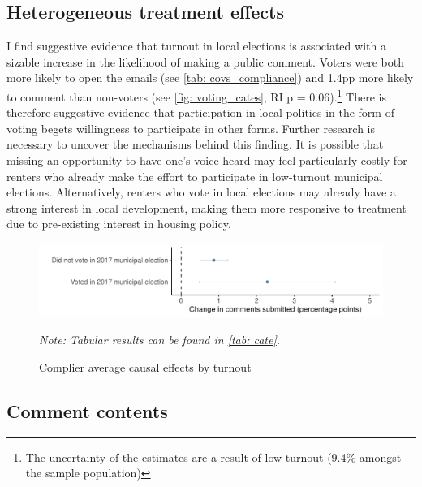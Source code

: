 \documentclass[12pt,final,fleqn]{article}
\theoremstyle{plain}
\begin{document}
\subsection{Heterogeneous treatment effects}

I find suggestive evidence that turnout in local elections is associated with a sizable increase in the likelihood of making a public comment. Voters were both more likely to open the emails (see \autoref{tab: covs_compliance}) and 1.4pp more likely to comment than non-voters (see \autoref{fig: voting_cates}, RI p = 0.06).\footnote{The uncertainty of the estimates are a result of low turnout (9.4\% amongst the sample population)} There is therefore suggestive evidence that participation in local politics in the form of voting begets willingness to participate in other forms. Further research is necessary to uncover the mechanisms behind this finding. It is possible that missing an opportunity to have one’s voice heard may feel particularly costly for renters who already make the effort to participate in low-turnout municipal elections. Alternatively, renters who vote in local elections may already have a strong interest in local development, making them more responsive to treatment due to pre-existing interest in housing policy. 

\begin{figure}[H]
\includegraphics[width = \textwidth]{../figs/fg4.pdf}
\caption{Complier average causal effects by turnout}
\vspace{-0.5cm}
{\small \textit{Note: Tabular results can be found in \autoref{tab: cate}.}}
\label{fig: voting_cates}
\end{figure}

\subsection{Comment contents}\label{sec:how}
\end{document}
